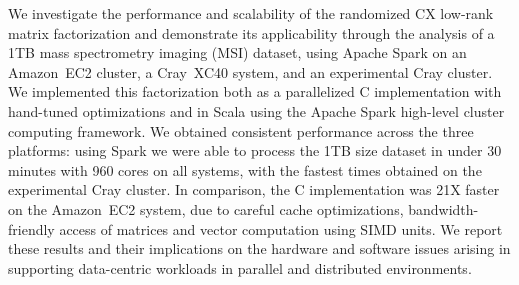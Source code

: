 We investigate the performance and scalability of the randomized CX low-rank
matrix factorization and demonstrate its applicability through the analysis of
a 1TB mass spectrometry imaging (MSI) dataset, using Apache Spark on an
Amazon~EC2 cluster, a Cray~XC40 system, and an experimental Cray cluster. We
implemented this factorization both as a parallelized C implementation with
hand-tuned optimizations and in Scala using the Apache Spark high-level cluster
computing framework. We obtained consistent performance across the three
platforms: using Spark we were able to process the 1TB size dataset in under 30
minutes with 960 cores on all systems, with the fastest times obtained on the
experimental Cray cluster. In comparison, the C implementation was 21X faster
on the Amazon~EC2 system, due to careful cache optimizations,
bandwidth-friendly access of matrices and vector computation using SIMD units.
We report these results and their implications on the hardware and software
issues arising in supporting data-centric workloads in parallel and distributed
environments.
